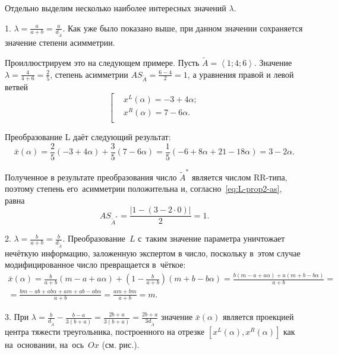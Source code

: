 Отдельно выделим несколько наиболее интересных значений $\lambda$.

1. $\displaystyle \lambda =\frac{a}{a+b}=\frac{a}{d_{\tilde A}}$. Как уже было показано выше, при данном значении сохраняется значение степени асимметрии.

Проиллюстрируем это на следующем примере. Пусть $\tilde{A}=\left\langle 1;4;6 \right\rangle $. Значение $\displaystyle \lambda =\frac{4}{4+6}=\frac{2}{5}$, степень асимметрии $\displaystyle AS_{\tilde A}=\frac{6-4}{2}=1$, а уравнения правой и левой ветвей
\begin{equation*}
  \left[ \begin{aligned}
    & {{x}^{L}}\left( \alpha  \right)=-3+4\alpha; \\ 
    & {{x}^{R}}\left( \alpha  \right)=7-6\alpha. \\ 
  \end{aligned} \right.
\end{equation*}

Преобразование L даёт следующий результат:
\begin{equation*}
  \bar{x}\left( \alpha  \right)=\frac{2}{5}\left( -3+4\alpha  \right)+\frac{3}{5}\left( 7-6\alpha  \right)=\frac{1}{5}\left( -6+8\alpha +21-18\alpha  \right)=3-2\alpha.
\end{equation*}

Полученное в результате преобразования число $\tilde A^{*}$ является числом RR-типа, поэтому степень его~асимметрии положительна и, согласно~\eqref{eq:L-prop2-as}, равна
\begin{equation*}
  AS_{\tilde A^{*}}=\frac{\left| 1-\left( 3-2\cdot 0 \right) \right|}{2}=1.
\end{equation*}

2. $\displaystyle \lambda =\frac{b}{a+b}=\frac{b}{d_{\tilde A}}$. Преобразование~$L$ с~таким значение параметра уничтожает нечёткую информацию, заложенную экспертом в число, поскольку в~этом случае модифицированное число превращается в~чёткое:
\begin{gather*}
  \bar{x}\left( \alpha  \right)=\frac{b}{a+b}\left( m-a+a\alpha  \right)+\left( 1-\frac{b}{a+b} \right)\left( m+b-b\alpha  \right)=\frac{b\left( m-a+a\alpha  \right)+a\left( m+b-b\alpha  \right)}{a+b}={} \\ 
  {} =\frac{bm-ab+ab\alpha +am+ab-ab\alpha }{a+b}=\frac{am+bm}{a+b}=m. 
\end{gather*}

3. При $\displaystyle \lambda =\frac{b}{d_{\tilde A}}-\frac{b-a}{3\left( b+a \right)}=\frac{2b+a}{3\left( b+a \right)}=\frac{2b+a}{3d_{\tilde A}}$ значение $\bar{x}(\alpha )$ является проекцией центра тяжести треугольника, построенного на отрезке $\left[ {{x}^{L}}(\alpha ),{{x}^{R}}(\alpha ) \right]$ как на~основании, на~ось~$Ox$ (см. рис.).

